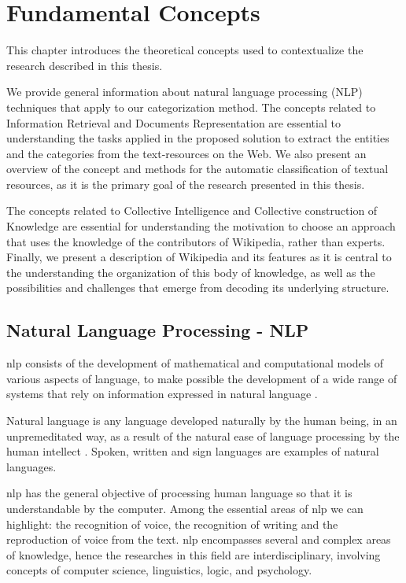 \chapter{\hspace*{3pt} Fundamental Concepts}
\label{chapter:related-concepts}


This chapter introduces the theoretical concepts used to contextualize the research described in this thesis.

We provide general information about natural language processing (NLP) techniques that apply to our categorization method. 
The concepts related to Information Retrieval and Documents Representation are essential to understanding the tasks applied in the proposed solution to extract the entities and the categories from the text-resources on the Web.
We also present an overview of the concept and methods for the automatic classification of textual resources, as it is the primary goal of the research presented in this thesis. 

The concepts related to Collective Intelligence and Collective construction of Knowledge are essential for understanding the motivation to choose an approach that uses the knowledge of the contributors of Wikipedia, rather than experts. Finally, we present a description of Wikipedia and its features as it is central to the understanding the organization of this body of knowledge, as well as the possibilities and challenges that emerge from decoding its underlying structure. 



\section{\hspace*{3pt}Natural Language Processing - NLP}


\gls{nlp} consists of the development of mathematical and computational models of various aspects of language, to make possible the development of a wide range of systems that rely on information expressed in natural language \cite{joshi1991natural}.

Natural language is any language developed naturally by the human being, in an unpremeditated way, as a result of the natural ease of language processing by the human intellect \cite{chomsky1975logical}. Spoken, written and sign languages are examples of natural languages. 

\gls{nlp} has the general objective of processing human language so that it is understandable by the computer. Among the essential areas of \gls{nlp} we can highlight: the recognition of voice, the recognition of writing and the reproduction of voice from the text. \gls{nlp} encompasses several and complex areas of knowledge, hence the  researches in this field are interdisciplinary, involving concepts of computer science, linguistics, logic, and psychology.

